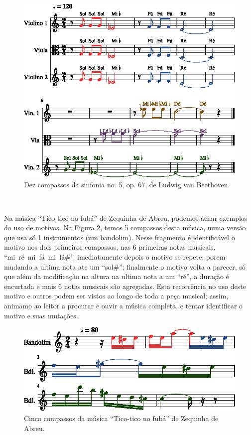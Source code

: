 \begin{figure}[!h]
  \centering
    \includegraphics[width=\workboxsize]{chapters/cap-musica-composer/Symphony5Op67-out-1.eps}
\caption{Dez compassos da sinfonia no. 5, op. 67, de Ludwig van Beethoven.}
\label{fig:10Symphony5Op67}
\end{figure}

~


\begin{example}
Na música ``Tico-tico no fubá'' de Zequinha de Abreu, podemos achar exemplos do uso de motivos. 
Na Figura \ref{fig:Tico-tico_no_fuba-1}, temos 5 compassos desta música,
numa versão que usa só 1 instrumentos (um bandolim).
Nesse fragmento é identificável o motivo nos dois primeiros compassos, 
nas 6 primeiras notas musicais, ``mi~ré~mi~fá~mi~lá$\#$''.
imediatamente depois o motivo se repete, porem mudando a ultima nota ate um ``sol$\#$'';
finalmente o motivo volta a parecer, só que além da modificação na altura na ultima nota a um ``ré'',
a duração é encurtada e mais 6 notas musicais são agregadas.
Esta recorrência no uso deste motivo e outros podem ser vistos ao longo de toda a peça musical;
assim, animamo ao leitor a procurar e ouvir a música completa, e tentar identificar o motivo e suas mutações. 
\end{example}

\begin{figure}[!h]
  \centering
    \includegraphics[width=\workboxsize]{chapters/cap-musica-composer/Tico-tico_no_fuba-1.eps}
\caption{Cinco compassos da música ``Tico-tico no fubá'' de Zequinha de Abreu.}
\label{fig:Tico-tico_no_fuba-1}
\end{figure}

~

